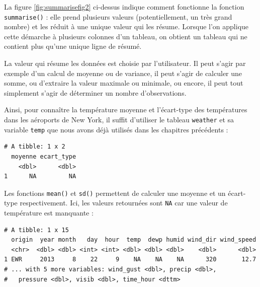 \documentclass[a4paperpaper,]{article}
\newenvironment{Shaded}{\begin{snugshade}}{\end{snugshade}}
\newcommand{\DataTypeTok}[1]{\textcolor[rgb]{0.00,0.34,0.68}{#1}}
\newcommand{\KeywordTok}[1]{\textcolor[rgb]{0.12,0.11,0.11}{\textbf{#1}}}
\newcommand{\NormalTok}[1]{\textcolor[rgb]{0.12,0.11,0.11}{#1}}
\newcommand{\OperatorTok}[1]{\textcolor[rgb]{0.12,0.11,0.11}{#1}}
\newcommand{\StringTok}[1]{\textcolor[rgb]{0.75,0.01,0.01}{#1}}
\begin{document}
La figure \ref{fig:summarisefig2} ci-dessus indique comment fonctionne la fonction \texttt{summarise()} : elle prend plusieurs valeurs (potentiellement, un très grand nombre) et les réduit à une unique valeur qui les résume. Lorsque l'on applique cette démarche à plusieurs colonnes d'un tableau, on obtient un tableau qui ne contient plus qu'une unique ligne de résumé.

La valeur qui résume les données est choisie par l'utilisateur. Il peut s'agir par exemple d'un calcul de moyenne ou de variance, il peut s'agir de calculer une somme, ou d'extraire la valeur maximale ou minimale, ou encore, il peut tout simplement s'agir de déterminer un nombre d'observations.

Ainsi, pour connaître la température moyenne et l'écart-type des températures dans les aéroports de New York, il suffit d'utiliser le tableau \texttt{weather} et sa variable \texttt{temp} que nous avons déjà utilisés dans les chapitres précédents :

\begin{Shaded}
\end{Shaded}

\begin{verbatim}
# A tibble: 1 x 2
  moyenne ecart_type
    <dbl>      <dbl>
1      NA         NA
\end{verbatim}

Les fonctions \texttt{mean()} et \texttt{sd()} permettent de calculer une moyenne et un écart-type respectivement. Ici, les valeurs retournées sont \texttt{NA} car une valeur de température est manquante :

\begin{Shaded}
\end{Shaded}

\begin{verbatim}
# A tibble: 1 x 15
  origin  year month   day  hour  temp  dewp humid wind_dir wind_speed
  <chr>  <dbl> <dbl> <int> <int> <dbl> <dbl> <dbl>    <dbl>      <dbl>
1 EWR     2013     8    22     9    NA    NA    NA      320       12.7
# ... with 5 more variables: wind_gust <dbl>, precip <dbl>,
#   pressure <dbl>, visib <dbl>, time_hour <dttm>
\end{verbatim}
\end{document}
